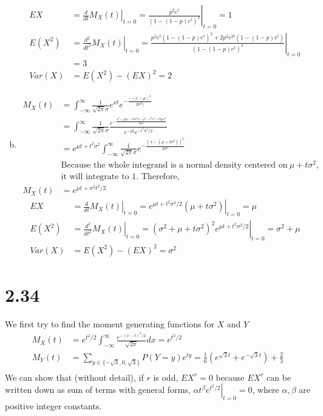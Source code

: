 \documentclass[letterpaper]{article}
\newcommand{\intii}{\int_{-\infty}^\infty}
\newcommand{\mgf}{M_X(t)}
\begin{document}
\begin{enumerate}[(a)]
    \begin{align*}
    EX & = \left. \frac{d}{dt} \mgf\right|_{t=0} = \left. \frac{p^2e^t}{\left(1-(1-p)e^t\right)^2}\right|_{t=0} = 1\\
    E(X^2) & = \left. \frac{d^2}{dt^2} \mgf\right|_{t=0} = \left. \frac{p^2e^t\left(1-(1-p)e^t\right)^2 + 2p^2e^{2t}\left(1-(1-p)e^t\right)}{\left(1-(1-p)e^t\right)^4}\right|_{t=0} \\
    & = 3 \\
    Var(X) & = E(X^2) - (EX)^2 = 2
    \end{align*}
    \item \begin{align*}
    \mgf & = \intii \frac{1}{\sqrt{2\pi}\sigma} e^{xt} e^{-\frac{-(x-\mu)^2}{2\sigma^2)}} \\
    & = \intii \frac{1}{\sqrt{2\pi}\sigma} \frac{e^{-\frac{x^2 - 2\mu x - 2t\sigma^2 x + \mu^2 + t^2\sigma^4 + 2t\mu\sigma^2}{2\sigma^2}}}{e^{-\mu t}e^{-t^2\sigma^2/2}} \\
    & = e^{\mu t + t^2\sigma^2} \intii \frac{1}{\sqrt{2\pi} \sigma} e^{-\frac{\left(x-(\mu + t\sigma^2)\right)^2}{2\sigma^2}} \\
    & \text{Because the whole integrand is a normal density centered on}~\mu+t\sigma^2, \\
    & \text{it will integrate to 1. Therefore, }\\
    \mgf & = e^{\mu t + \sigma^2 t^2/2}
    \end{align*}
    \begin{align*}
    EX & = \left. \frac{d}{dt} \mgf\right|_{t=0} = \left. e^{\mu t + t^2\sigma^2/2}(\mu+t\sigma^2)\right|_{t=0} = \mu \\
    E(X^2) & = \left. \frac{d^2}{dt^2} \mgf\right|_{t=0} = \left.
    (\sigma^2 + \mu + t\sigma^2)^2 e^{\mu t + t^2\sigma^2/2}\right|_{t=0} = \sigma^2 + \mu \\
    Var(X) & = E(X^2) - (EX)^2 = \sigma^2 
    \end{align*}
    \end{enumerate}

    \section*{2.34}
    We first try to find the moment generating functions for $X$ and $Y$
    \begin{align*}
    \mgf & = e^{t^2/2} \intii \frac{e^{-(x-t)^2/2}}{\sqrt{2\pi}} dx = e^{t^2/2} \\
    M_Y(t) & = \sum_{y \in \{-\sqrt{3}, 0, \sqrt{3}\}} P(Y = y) e^{ty} = \frac{1}{6} (e^{\sqrt{3}t} + e^{-\sqrt{3}t}) + \frac{2}{3} \\
    \end{align*}
    We can show that (without detail), if $r$ is odd, $EX^r= 0$ because $EX^r$ can be written down as sum of terms with general forms,
    $\left. \alpha t^\beta e^{t^2/2}\right|_{t=0} = 0$, where $\alpha, \beta$ are positive integer constants.
\end{document}
